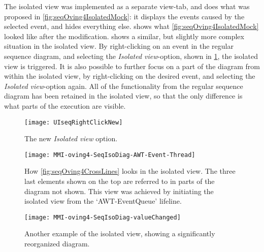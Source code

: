 The isolated view was implemented as a separate view-tab, and does what was proposed in \cref{fig:seqOving4IsolatedMock}: it displays the events caused by the selected event, and hides everything else.
 shows what \cref{fig:seqOving4IsolatedMock} looked like after the modification.
 shows a similar, but slightly more complex situation in the isolated view.
By right-clicking on an event in the regular sequence diagram, and selecting the \emph{Isolated view}-option, shown in \cref{fig:UISeqRightClickNew}, the isolated view is triggered.
It is also possible to further focus on a part of the diagram from within the isolated view, by right-clicking on the desired event, and selecting the \emph{Isolated view}-option again.
All of the functionality from the regular sequence diagram has been retained in the isolated view, so that the only difference is what parts of the execution are visible.
\begin{figure}[H]
	\centering
	\texttt{[image: UIseqRightClickNew]}
	\caption{The new \emph{Isolated view} option.}
	\label{fig:UISeqRightClickNew}
\end{figure}

\begin{figure}[H]
	\centering
	\texttt{[image: MMI-oving4-SeqIsoDiag-AWT-Event-Thread]}
	\caption[How \cref{fig:seqOving4CrossLines} looks in the isolated view.]{How \cref{fig:seqOving4CrossLines} looks in the isolated view. The three last elements shown on the top are referred to in parts of the diagram not shown. This view was achieved by initiating the isolated view from the `AWT-EventQueue' lifeline.}
	\label{fig:MMI-oving4-SeqIsoDiag-AWT-Event-Thread}
\end{figure}

\begin{figure}[H]
	\centering
	\texttt{[image: MMI-oving4-SeqIsoDiag-valueChanged]}
	\caption{Another example of the isolated view, showing a significantly reorganized diagram.}
	\label{fig:MMI-oving4-SeqIsoDiag-valueChanged}
\end{figure}

